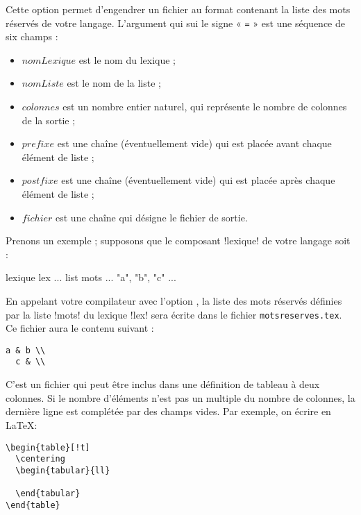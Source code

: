  Cette option permet d'engendrer un fichier au format contenant la liste des mots réservés de votre langage. L'argument qui sui le signe « \texttt{=} » est une séquence de six champs :
\begin{itemize}
  \item $nomLexique$ est le nom du lexique ;
  \item $nomListe$ est le nom de la liste ;
  \item $colonnes$ est un nombre entier naturel, qui représente le nombre de colonnes de la sortie ;
  \item $prefixe$ est une chaîne (éventuellement vide) qui est placée avant chaque élément de liste ;
  \item $postfixe$ est une chaîne (éventuellement vide) qui est placée après chaque élément de liste ;
  \item $fichier$ est une chaîne qui désigne le fichier de sortie.
\end{itemize}

Prenons un exemple ; supposons que le composant \ggs!lexique! de votre langage soit :
\begin{galgas}
lexique lex {
  ...
  list mots ... { "a", "b", "c" }
  ...
}
\end{galgas}

En appelant votre compilateur avec l'option , la liste des mots réservés définies par la liste \ggs!mots! du lexique \ggs!lex! sera écrite dans le fichier \texttt{motsreserves.tex}. Ce fichier aura le contenu suivant :
\begin{lstlisting}[backgroundcolor=\color{yellow!10}, frame=tlbr, basicstyle=\small\tt]
  a & b \\
  c & \\
\end{lstlisting}

C'est un fichier qui peut être inclus dans une définition de tableau à deux colonnes. Si le nombre d'éléments n'est pas un multiple du nombre de colonnes, la dernière ligne est complétée par des champs vides. Par exemple, on écrire en \LaTeX :
\begin{lstlisting}[backgroundcolor=\color{yellow!10}, frame=tlbr, basicstyle=\small\tt]
\begin{table}[!t]
  \centering
  \begin{tabular}{ll}
    
  \end{tabular}
\end{table}
\end{lstlisting}

